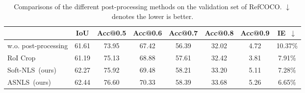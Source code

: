 \documentclass[10pt,twocolumn,letterpaper]{article}
\begin{document}
\begin{table*}[t]
	\centering
	\caption{Comparisons of the different post-processing methods  on the validation set of RefCOCO. $\downarrow$ denotes the lower is better. }
	\begin{tabular}{|l|c|c|c|c|c|c|c|}
		\hline
		\multicolumn{1}{|c|}{} & IoU & Acc@0.5 & Acc@0.6 & Acc@0.7 & Acc@0.8 & Acc@0.9 & IE~$\downarrow$ \\ \hline
		w.o. post-processing & 61.61 & 73.95 & 67.42 & 56.39 & 32.02 & 4.72 & 10.37\% \\
		RoI Crop~\cite{he2017mask,ren2017faster} & 61.19 & 75.13 & 68.88 & 57.61 & 32.42 & 3.81 & 7.91\% \\
		Soft-NLS~(ours) & 62.27 & 75.92 & 69.48 & 58.21 & 33.20 & 5.11 & 7.28\% \\
		ASNLS~(ours) & 62.44 & 76.60 & 70.33 & 58.39 & 33.68 & 5.26 & 6.65\% \\ \hline
	\end{tabular}
	
	\label{tab2}
	\vspace{-0.5em}
\end{table*}
\end{document}
